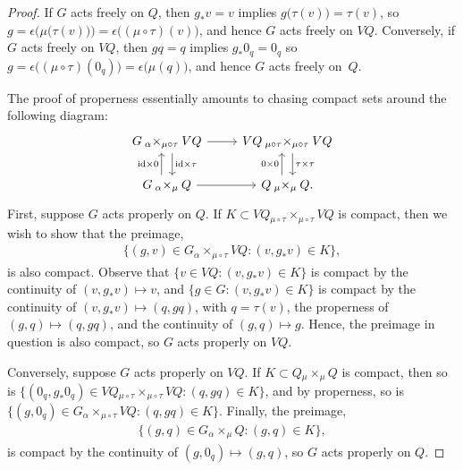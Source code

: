 \documentclass[10pt,a4paper]{amsart}
\numberwithin{equation}{section}
\begin{document}
\begin{proof} If $G$ acts freely on $Q$, then $ g _\ast v = v $ implies $ g \bigl( \tau (v) \bigr) = \tau (v) $, so $ g = \epsilon \bigl( \mu \bigl( \tau (v) \bigr) \bigr)= \epsilon \bigl( (\mu \circ \tau) (v) \bigr) $, and hence $G$ acts freely on $ V Q $. Conversely, if $G$ acts freely on $ V Q $, then $ g q = q $ implies $ g _\ast 0 _q = 0 _q $ so $ g = \epsilon \bigl( ( \mu \circ \tau ) ( 0 _q ) \bigr) = \epsilon \bigl( \mu (q) \bigr) $, and hence $G$ acts freely on~$Q$.

The proof of properness essentially amounts to chasing compact sets around the following diagram:
 \begin{equation*}
 \begin{tikzcd}
 G \mathbin{ _\alpha \times _{ \mu \circ \tau } } V Q \arrow[r]
 \arrow[d, shift left=1ex, "\mathrm{id} \times \tau"] & VQ
 \mathbin{ _{\mu \circ \tau } \times _{ \mu \circ
 \tau } } V Q \arrow[d, shift left=1ex, "\tau \times \tau"] \\
 G \mathbin{ _\alpha \times _\mu } Q \arrow[r] \arrow[u, shift
 left=1ex, "\mathrm{id} \times 0 "] & Q \mathbin{ _\mu \times
 _\mu } Q \arrow[u, shift left=1ex, "0 \times 0"] .
 \end{tikzcd}
 \end{equation*}
 First, suppose $G$ acts properly on $Q$. If $ K \subset V Q \mathbin{ _{\mu \circ \tau } \times _{\mu \circ \tau}} V Q $ is compact, then we wish to show that the preimage,
 \begin{gather*}
 \bigl\{ ( g, v ) \in G \mathbin{ _\alpha \times _{ \mu \circ \tau } } V Q \colon ( v, g _\ast v) \in K \bigr\} ,
 \end{gather*}
is also compact. Observe that $ \bigl\{ v \in V Q \colon ( v, g _\ast v) \in K \bigr\} $ is compact by the continuity of $ ( v, g _\ast v ) \mapsto v $, and $ \bigl\{ g \in G \colon ( v, g _\ast v) \in K \bigr\} $ is compact by the continuity of $ ( v, g _\ast v ) \mapsto ( q, g q ) $, with $ q = \tau (v) $, the properness of $ ( g, q ) \mapsto ( q, gq ) $, and the continuity of $ ( g, q ) \mapsto g $. Hence, the preimage in question is also compact, so $G$ acts properly on $ V Q $.

 Conversely, suppose $G$ acts properly on $ V Q $. If $ K \subset Q \mathbin { _\mu \times _\mu } Q $ is compact, then so is $ \bigl\{ ( 0 _q , g _\ast 0 _q ) \in V Q \mathbin{ _{\mu \circ \tau } \times _{\mu \circ \tau}} V Q \colon ( q, g q ) \in K \bigr\} $, and by properness, so is $ \bigl\{ ( g, 0 _q ) \in G \mathbin{ _\alpha \times _{ \mu \circ \tau } } V Q \colon ( q, gq ) \in K \bigr\} $. Finally, the preimage,
 \begin{gather*}
 \bigl\{ ( g, q ) \in G \mathbin { _\alpha \times _\mu } Q \colon ( g, q ) \in K \bigr\},
 \end{gather*}
 is compact by the continuity of $ ( g, 0 _q ) \mapsto ( g, q ) $, so $G$ acts properly on $Q$.
\end{proof}
\end{document}
